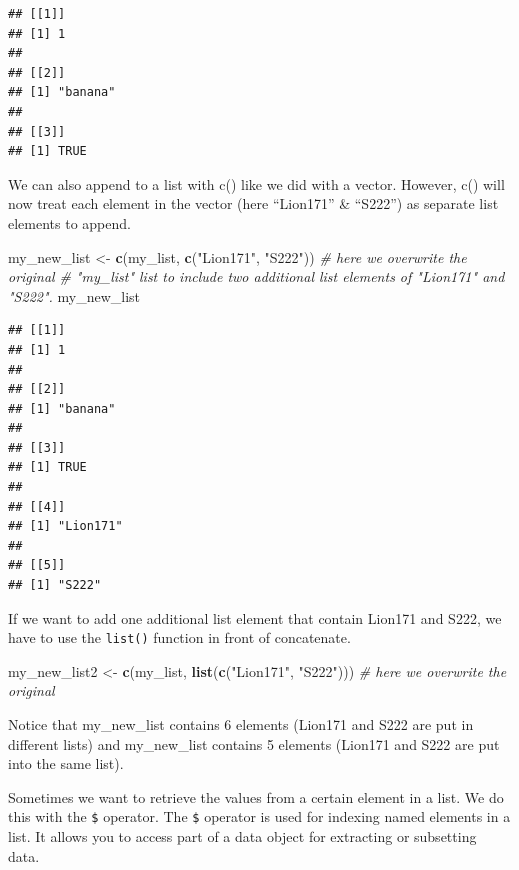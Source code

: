 \documentclass[
]{book}
\newenvironment{Shaded}{\begin{snugshade}}{\end{snugshade}}
\newcommand{\CommentTok}[1]{\textcolor[rgb]{0.56,0.35,0.01}{\textit{#1}}}
\newcommand{\FunctionTok}[1]{\textcolor[rgb]{0.13,0.29,0.53}{\textbf{#1}}}
\newcommand{\NormalTok}[1]{#1}
\newcommand{\OtherTok}[1]{\textcolor[rgb]{0.56,0.35,0.01}{#1}}
\newcommand{\StringTok}[1]{\textcolor[rgb]{0.31,0.60,0.02}{#1}}
\begin{document}
\begin{verbatim}
## [[1]]
## [1] 1
## 
## [[2]]
## [1] "banana"
## 
## [[3]]
## [1] TRUE
\end{verbatim}

We can also append to a list with c() like we did with a vector. However, c() will now treat each element in the vector (here ``Lion171'' \& ``S222'') as separate list elements to append.

\begin{Shaded}
\begin{Highlighting}[]
\NormalTok{my\_new\_list }\OtherTok{\textless{}{-}} \FunctionTok{c}\NormalTok{(my\_list, }\FunctionTok{c}\NormalTok{(}\StringTok{"Lion171"}\NormalTok{, }\StringTok{"S222"}\NormalTok{)) }\CommentTok{\# here we overwrite the original }
\CommentTok{\# "my\_list" list to include two additional list elements of "Lion171" and "S222".}
\NormalTok{my\_new\_list}
\end{Highlighting}
\end{Shaded}

\begin{verbatim}
## [[1]]
## [1] 1
## 
## [[2]]
## [1] "banana"
## 
## [[3]]
## [1] TRUE
## 
## [[4]]
## [1] "Lion171"
## 
## [[5]]
## [1] "S222"
\end{verbatim}

If we want to add one additional list element that contain Lion171 and S222, we have to use the \texttt{list()} function in front of concatenate.

\begin{Shaded}
\begin{Highlighting}[]
\NormalTok{my\_new\_list2 }\OtherTok{\textless{}{-}} \FunctionTok{c}\NormalTok{(my\_list, }\FunctionTok{list}\NormalTok{(}\FunctionTok{c}\NormalTok{(}\StringTok{"Lion171"}\NormalTok{, }\StringTok{"S222"}\NormalTok{))) }\CommentTok{\# here we overwrite the original }
\end{Highlighting}
\end{Shaded}

Notice that my\_new\_list contains 6 elements (Lion171 and S222 are put in different lists) and my\_new\_list contains 5 elements (Lion171 and S222 are put into the same list).

Sometimes we want to retrieve the values from a certain element in a list. We do this with the \texttt{\$} operator. The \texttt{\$} operator is used for indexing named elements in a list. It allows you to access part of a data object for extracting or subsetting data.
\end{document}

